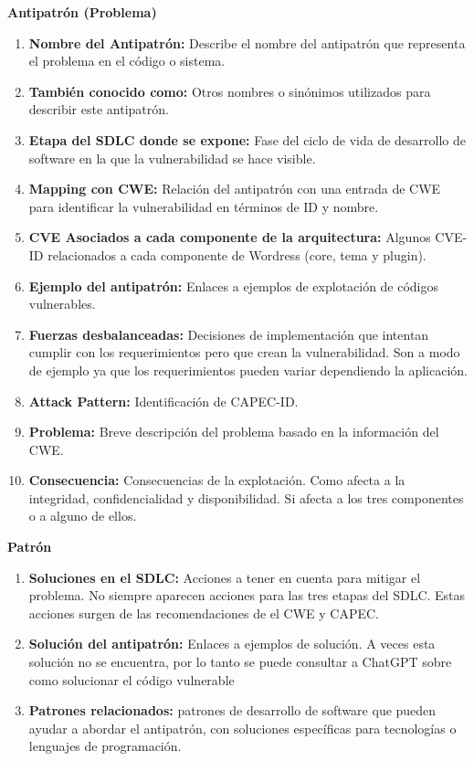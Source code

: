 
\textbf{Antipatrón (Problema)}

    \begin{enumerate}
        \item \textbf{Nombre del Antipatrón:} Describe el nombre del antipatrón que representa el problema en el código o sistema.
        \item \textbf{También conocido como:} Otros nombres o sinónimos utilizados para describir este antipatrón.
        \item \textbf{Etapa del SDLC donde se expone:} Fase del ciclo de vida de desarrollo de software en la que la vulnerabilidad se hace visible. 
        \item \textbf{Mapping con CWE:} Relación del antipatrón con una entrada de CWE para identificar la vulnerabilidad en términos de ID y nombre.
        \item \textbf{CVE Asociados a cada componente de la arquitectura:} Algunos CVE-ID relacionados a cada componente de Wordress (core, tema y plugin).
        \item \textbf{Ejemplo del antipatrón:} Enlaces a ejemplos de explotación de códigos vulnerables. 
        \item \textbf{Fuerzas desbalanceadas:} Decisiones de implementación que intentan cumplir con los requerimientos pero que crean la vulnerabilidad. Son a modo de ejemplo ya que los requerimientos pueden variar dependiendo la aplicación.
        \item \textbf{Attack Pattern:} Identificación de CAPEC-ID.
        \item \textbf{Problema:} Breve descripción del problema basado en la información del CWE.
        \item \textbf{Consecuencia:} Consecuencias de la explotación. Como afecta a la integridad, confidencialidad y disponibilidad. Si afecta a los tres componentes o a alguno de ellos.
    \end{enumerate}

\textbf{Patrón}

    \begin{enumerate}
        \item \textbf{Soluciones en el SDLC:}  Acciones a tener en cuenta para mitigar el problema. No siempre aparecen acciones para las tres etapas del SDLC. Estas acciones surgen de las recomendaciones de el CWE y CAPEC.
        \item \textbf{Solución del antipatrón:} Enlaces a ejemplos de solución. A veces esta solución no se encuentra, por lo tanto se puede consultar a ChatGPT sobre como solucionar el código vulnerable
        \item \textbf{Patrones relacionados:} patrones de desarrollo de software que pueden ayudar a abordar el antipatrón, con soluciones específicas para tecnologías o lenguajes de programación.
    \end{enumerate}